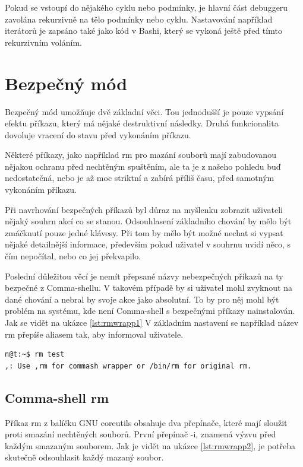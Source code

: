 \documentclass[thesis=M,czech]{FITthesis}[2012/06/26]
\begin{document}
Pokud se vstoupí do nějakého cyklu nebo podmínky, je hlavní část debuggeru zavolána rekurzivně na tělo podmínky nebo cyklu. Nastavování například iterátorů je zapsáno také jako kód v Bashi, který se vykoná ještě před tímto rekurzivním voláním.


%
%
%
%
%
\section{Bezpečný mód}

Bezpečný mód umožňuje dvě základní věci. Tou jednodušší je pouze vypsání efektu příkazu, který má nějaké destruktivní následky. Druhá funkcionalita dovoluje vracení do stavu před vykonáním příkazu.

Některé příkazy, jako například rm pro mazání souborů mají zabudovanou nějakou ochranu před nechtěným spuštěním, ale ta je z našeho pohledu buď nedostatečná, nebo je až moc striktní a zabírá příliš času, před samotným vykonáním příkazu.

Při navrhování bezpečných příkazů byl důraz na myšlenku zobrazit uživateli nějaký souhrn akcí co se stanou. Odsouhlasení základního chování by mělo být zmáčknutí pouze jedné klávesy. Při tom by mělo být možné nechat si vypsat nějaké detailnější informace, především pokud uživatel v souhrnu uvidí něco, s čím nepočítal, nebo co jej překvapilo.

Poslední důležitou věcí je nemít přepsané názvy nebezpečných příkazů na ty bezpečné z Comma-shellu. V takovém případě by si uživatel mohl zvyknout na dané chování a nebral by svoje akce jako absolutní. To by pro něj mohl být problém na systému, kde není Comma-shell s bezpečnými příkazy nainstalován. Jak se vidět na ukázce \ref{lst:rmwrapp1} V základním nastavení se například název rm přepíše aliasem tak, aby informoval uživatele.

\begin{minipage}{\linewidth}
\begin{lstlisting}[language=bash, caption={Přepsání nebezpečných příkazů}, label={lst:rmwrapp1}]
n@t:~$ rm test
,: Use ,rm for commash wrapper or /bin/rm for original rm.
\end{lstlisting}
\end{minipage}


%
\subsection{Comma-shell rm}

Příkaz rm z balíčku GNU coreutils obsahuje dva přepínače, které mají sloužit proti smazání nechtěných souborů. První přepínač -i, znamená výzvu před každým smazaným souborem. Jak je vidět na ukázce \ref{lst:rmwrapp2}, je potřeba skutečně odsouhlasit každý mazaný soubor.
\end{document}
